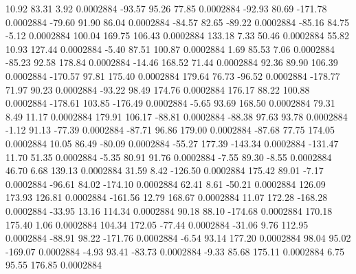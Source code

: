        10.92       83.31        3.92     0.0002884
      -93.57       95.26       77.85     0.0002884
      -92.93       80.69     -171.78     0.0002884
      -79.60       91.90       86.04     0.0002884
      -84.57       82.65      -89.22     0.0002884
      -85.16       84.75       -5.12     0.0002884
      100.04      169.75      106.43     0.0002884
      133.18        7.33       50.46     0.0002884
       55.82       10.93      127.44     0.0002884
       -5.40       87.51      100.87     0.0002884
        1.69       85.53        7.06     0.0002884
      -85.23       92.58      178.84     0.0002884
      -14.46      168.52       71.44     0.0002884
       92.36       89.90      106.39     0.0002884
     -170.57       97.81      175.40     0.0002884
      179.64       76.73      -96.52     0.0002884
     -178.77       71.97       90.23     0.0002884
      -93.22       98.49      174.76     0.0002884
      176.17       88.22      100.88     0.0002884
     -178.61      103.85     -176.49     0.0002884
       -5.65       93.69      168.50     0.0002884
       79.31        8.49       11.17     0.0002884
      179.91      106.17      -88.81     0.0002884
      -88.38       97.63       93.78     0.0002884
       -1.12       91.13      -77.39     0.0002884
      -87.71       96.86      179.00     0.0002884
      -87.68       77.75      174.05     0.0002884
       10.05       86.49      -80.09     0.0002884
      -55.27      177.39     -143.34     0.0002884
     -131.47       11.70       51.35     0.0002884
       -5.35       80.91       91.76     0.0002884
       -7.55       89.30       -8.55     0.0002884
       46.70        6.68      139.13     0.0002884
       31.59        8.42     -126.50     0.0002884
      175.42       89.01       -7.17     0.0002884
      -96.61       84.02     -174.10     0.0002884
       62.41        8.61      -50.21     0.0002884
      126.09      173.93      126.81     0.0002884
     -161.56       12.79      168.67     0.0002884
       11.07      172.28     -168.28     0.0002884
      -33.95       13.16      114.34     0.0002884
       90.18       88.10     -174.68     0.0002884
      170.18      175.40        1.06     0.0002884
      104.34      172.05      -77.44     0.0002884
      -31.06        9.76      112.95     0.0002884
      -88.91       98.22     -171.76     0.0002884
       -6.54       93.14      177.20     0.0002884
       98.04       95.02     -169.07     0.0002884
       -4.93       93.41      -83.73     0.0002884
       -9.33       85.68      175.11     0.0002884
        6.75       95.55      176.85     0.0002884
